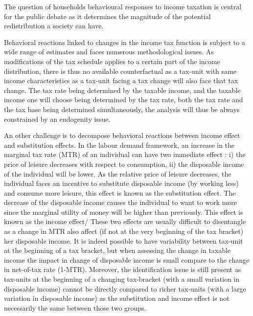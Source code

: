 




The question of households behavioural responses to income taxation is central for the public debate as it determines the magnitude of the potential redistribution a society can have.

Behavioral reactions linked to changes in the income tax function is subject to a wide range of estimates and faces numerous methodological issues. As modifications of the tax schedule applies to a certain part of the income distribution, there is thus no available counterfactual as a tax-unit with same income characteristics as a tax-unit facing a tax change will also face that tax change. The tax rate being determined by the taxable income, and the taxable income one will choose being determined by the tax rate, both the tax rate and the tax base being determined simultaneously, the analysis will thus be always constrained by an endogenity issue.

An other challenge is to decompose behavioral reactions between income effect and substitution effects.
In the labour demand framework, an increase in the marginal tax rate (MTR) of an individual can have two immediate effect : i) the price of leisure decreases with respect to consumption, ii) the disposable income of the individual will be lower.
As the relative price of leisure decreases, the individual faces an incentive to substitute disposable income (by working less) and consume more leisure, this effect is known as the substitution effect. 
The decrease of the disposable income causes the individual to want to work more since the marginal utility of money will be higher than previously. This effect is known as the income effect/
These two effects are usually difficult to disentangle as a change in MTR also affect (if not at the very beginning of the tax bracket) her disposable income. 
It is indeed possible to have variability between tax-unit at the beginning of a tax bracket, but when assessing the change in taxable income the impact in change of disposable income is small compare to the change in net-of-tax rate (1-MTR). Moreover, the identification issue is still present as tax-units at the beginning of a changing tax-bracket (with a small variation in disposable income) cannot be directly compared to richer tax-units (with a large variation in disposable income) as the substitution and income effect is not necessarily the same between those two groups.

